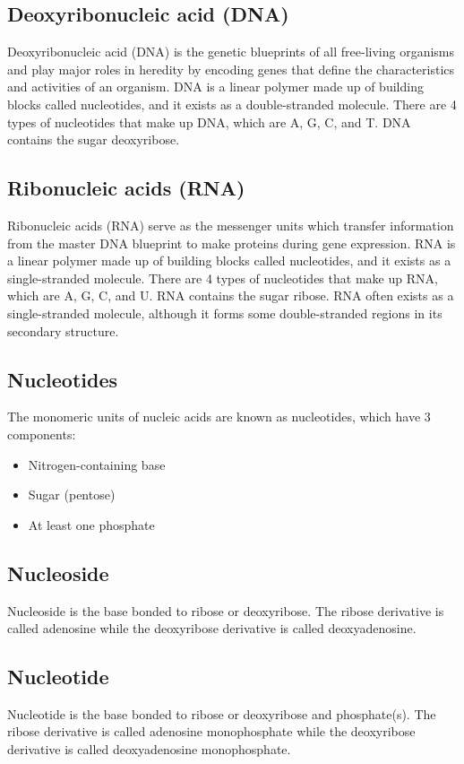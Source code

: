 \documentclass[11pt]{article}
\begin{document}
\subsection{Deoxyribonucleic acid (DNA)}
\label{sec:orgd168ea0}
Deoxyribonucleic acid (DNA) is the genetic blueprints of all free-living organisms and play major roles in heredity by encoding genes that define the characteristics and activities of an organism. DNA is a linear polymer made up of building blocks called nucleotides, and it exists as a double-stranded molecule. There are 4 types of nucleotides that make up DNA, which are A, G, C, and T. DNA contains the sugar deoxyribose.
\subsection{Ribonucleic acids (RNA)}
\label{sec:org52b1721}
Ribonucleic acids (RNA) serve as the messenger units which transfer information from the master DNA blueprint to make proteins during gene expression. RNA is a linear polymer made up of building blocks called nucleotides, and it exists as a single-stranded molecule. There are 4 types of nucleotides that make up RNA, which are A, G, C, and U. RNA contains the sugar ribose. RNA often exists as a single-stranded molecule, although it forms some double-stranded regions in its secondary structure.
\subsection{Nucleotides}
\label{sec:org9e3508b}
The monomeric units of nucleic acids are known as nucleotides, which have 3 components:
\begin{itemize}
\item Nitrogen-containing base
\item Sugar (pentose)
\item At least one phosphate
\end{itemize}
\subsection{Nucleoside}
\label{sec:org934c92f}
Nucleoside is the base bonded to ribose or deoxyribose. The ribose derivative is called adenosine while the deoxyribose derivative is called deoxyadenosine.
\subsection{Nucleotide}
\label{sec:org5129a5c}
Nucleotide is the base bonded to ribose or deoxyribose and phosphate(s). The ribose derivative is called adenosine monophosphate while the deoxyribose derivative is called deoxyadenosine monophosphate.
\end{document}
